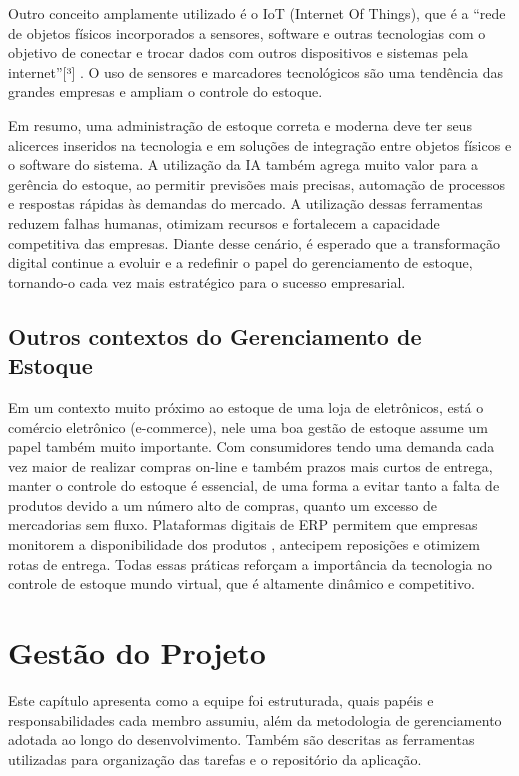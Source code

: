 \documentclass[
	12pt,				%
	openany,			%
	twoside,			%
	a4paper,			%
	english,			%
	brazil				%
	]{abntex2}
\begin{document}
Outro conceito amplamente utilizado é o IoT (Internet Of Things), que é a “rede de objetos físicos incorporados a sensores, software e outras tecnologias com o objetivo de conectar e trocar dados com outros dispositivos e sistemas pela internet”[³] . O uso de sensores e marcadores tecnológicos  são uma tendência das grandes empresas e ampliam o controle do estoque.

Em resumo, uma administração de estoque correta e moderna deve ter seus alicerces inseridos na tecnologia e em soluções de integração entre objetos físicos e o software do sistema. A utilização da IA também agrega muito valor para a gerência do estoque, ao permitir previsões mais precisas, automação de processos e respostas rápidas às demandas do mercado. A utilização dessas ferramentas reduzem falhas humanas, otimizam recursos e fortalecem a capacidade competitiva das empresas. Diante desse cenário, é esperado que a transformação digital continue a evoluir e a redefinir o papel do gerenciamento de estoque, tornando-o cada vez mais estratégico para o sucesso empresarial.

\section{Outros contextos do Gerenciamento de Estoque}
Em um contexto muito próximo ao estoque de uma loja de eletrônicos, está o comércio eletrônico (e-commerce), nele uma boa gestão de estoque assume um papel também muito importante. Com consumidores tendo uma demanda cada vez maior de realizar compras on-line e também prazos mais curtos de entrega, manter o controle do estoque é essencial, de uma forma a evitar tanto a falta de produtos devido a um número alto de compras, quanto um excesso de mercadorias sem fluxo. Plataformas digitais de ERP permitem que empresas monitorem a disponibilidade dos produtos , antecipem reposições e otimizem rotas de entrega. Todas essas práticas reforçam a importância da tecnologia no controle de estoque mundo virtual, que é altamente dinâmico e competitivo.

\chapter{Gestão do Projeto}

Este capítulo apresenta como a equipe foi estruturada, quais papéis e responsabilidades cada membro assumiu, além da metodologia de gerenciamento adotada ao longo do desenvolvimento. Também são descritas as ferramentas utilizadas para organização das tarefas e o repositório da aplicação.
\end{document}
